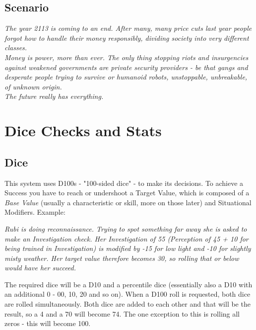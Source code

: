 \documentclass[11pt,a4paper,openany,dvipsnames]{book}
\begin{document}
	\section{Scenario}
	\vspace{5mm}
	\begin{exampleblock}
		\itshape
		The year 2113 is coming to an end. After many, many price cuts last year people forgot how to handle their money responsibly, dividing society into \emph{very} different classes. \\
		Money is power, more than ever. The only thing stopping riots and insurgencies against weakened governments are private security providers - be that gangs and desperate people trying to survive or humanoid robots, unstoppable, unbreakable, of unknown origin. \\
		The future really has everything.
	\end{exampleblock}

	\chapter{Dice Checks and Stats}
	\vspace{-10mm} %
	\section{Dice}
	This system uses D100s - "100-sided dice" - to make its decisions. To achieve a Success you have to reach or undershoot a Target Value, which is composed of a \emph{Base Value} (usually a characteristic or skill, more on those later) and Situational Modifiers. Example:

	\begin{exampleblock}
		\itshape
		Rubi is doing reconnaissance.
		Trying to spot something far away she is asked to make an Investigation check.
		Her Investigation of 55 (Perception of 45 + 10 for being trained in Investigation) is modified by -15 for low light and -10 for slightly misty weather. Her target value therefore becomes 30, so rolling that or below would have her succeed.
	\end{exampleblock}

	The required dice will be a D10
		and a percentile dice
		(essentially also a D10 with an additional 0 - 00, 10, 20 and so on).
	When a D100 roll is requested, both dice are rolled simultaneously.
	Both dice are added to each other and that will be the result,
		so a 4 and a 70 will become 74.
	The one exception to this is rolling all zeros - this will become 100.
\end{document}
